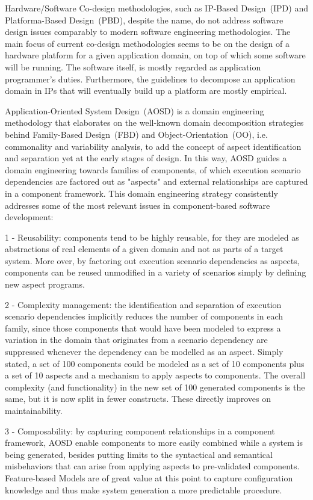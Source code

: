 Hardware/Software Co-design methodologies, such as IP-Based Design~(IPD) and Platforma-Based Design~(PBD), despite the name, do not address software design issues comparably to modern software engineering methodologies. The main focus of current co-design methodologies seems to be on the design of a hardware platform for a given application domain, on top of which some software will be running. The software itself, is mostly regarded as application programmer's duties. Furthermore, the guidelines to decompose an application domain in IPs that will eventually build up a platform are mostly empirical. 

Application-Oriented System Design~(AOSD) is a domain engineering methodology that elaborates on the well-known domain decomposition strategies behind Family-Based Design~(FBD) and Object-Orientation~(OO), i.e. commonality and variability analysis, to add the concept of aspect identification and separation yet at the early stages of design. In this way, AOSD guides a domain engineering towards families of components, of which execution scenario dependencies are factored out as "aspects" and external relationships are captured in a component framework. This domain engineering strategy consistently addresses some of the most relevant issues in component-based software development:

1 - Reusability: components tend to be highly reusable, for they are modeled as abstractions of real elements of a given domain and not as parts of a target system. More over, by factoring out execution scenario dependencies as aspects, components can be reused unmodified in a variety of scenarios simply by defining new aspect programs.

2 - Complexity management: the identification and separation of execution scenario dependencies implicitly reduces the number of components in each family, since those components that would have been modeled to express a variation in the domain that originates from a scenario dependency are suppressed whenever the dependency can be modelled as an aspect. Simply stated, a set of 100 components could be modeled as a set of 10 components plus a set of 10 aspects and a mechanism to apply aspects to components. The overall complexity (and functionality) in the new set of 100 generated components is the same, but it is now split in fewer constructs. These directly improves on maintainability.

3 - Composability: by capturing component relationships in a component framework, AOSD enable components to more easily combined while a system is being generated, besides putting limits to the syntactical and semantical misbehaviors that can arise from applying aspects to pre-validated components. Feature-based Models are of great value at this point to capture configuration knowledge and thus make system generation a more predictable procedure. 

